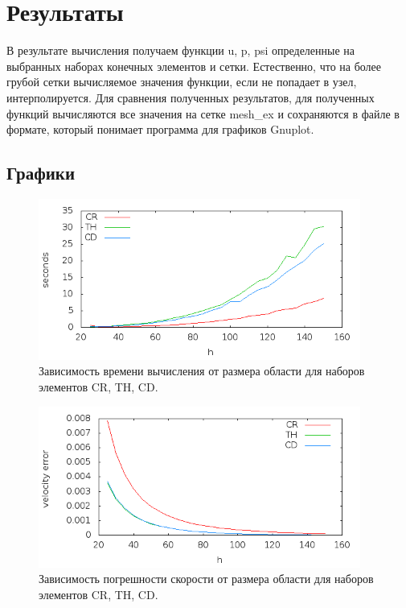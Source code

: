\documentclass[12pt]{article}
\begin{document}
\section{Результаты}
В результате вычисления получаем функции u, p, psi определенные на выбранных наборах конечных элементов и сетки. Естественно, что на более грубой сетки вычисляемое значения функции, если не попадает в узел, интерполируется. Для сравнения полученных результатов, для полученных функций вычисляются все значения на сетке mesh\_ex и сохраняются в файле в формате, который понимает программа для графиков Gnuplot.

\subsection{Графики}
\begin{figure}
	\begin{center}
		\includegraphics[width=400px]{pics/time}
		\caption{Зависимость времени вычисления от размера области для наборов элементов CR, TH, CD.}
		\label{fg:time}
	\end{center}
\end{figure}

\begin{figure}
	\begin{center}
		\includegraphics[width=400px]{pics/u_err}
		\caption{Зависимость погрешности скорости от размера области для наборов элементов CR, TH, CD.}
		\label{fg:u_err}
	\end{center}
\end{figure}
\end{document}

